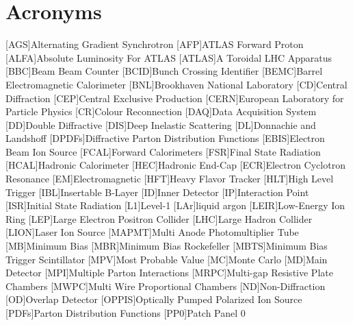 \chapter{Acronyms}\label{chapter:acronyms}

\begin{acronym}[BRAHMS]
	[AGS]{Alternating Gradient Synchrotron}
	[AFP]{ATLAS Forward Proton}
	[ALFA]{Absolute Luminosity For ATLAS}
	[ATLAS]{A Toroidal LHC Apparatus}
	[BBC]{Beam Beam Counter}
	[BCID]{Bunch Crossing Identifier}
	[BEMC]{Barrel Electromagnetic Calorimeter}
	[BNL]{Brookhaven National Laboratory}
	[CD]{Central Diffraction}
	[CEP]{Central Exclusive Production}
	[CERN]{European Laboratory for Particle Physics }
	[CR]{Colour Reconnection}
	[DAQ]{Data Acquisition System}
	[DD]{Double Diffractive}
	[DIS]{Deep Inelastic Scattering}
	[DL]{Donnachie and Landshoff}
	[DPDFs]{Diffractive Parton
	Distribution Functions}
	[EBIS]{Electron Beam Ion Source}
	[FCAL]{Forward Calorimeters}
	[FSR]{Final State Radiation}
	[HCAL]{Hadronic Calorimeter}
	[HEC]{Hadronic End-Cap}
	[ECR]{Electron Cyclotron Resonance}
	[EM]{Electromagnetic}
	[HFT]{Heavy Flavor Tracker}
	[HLT]{High Level Trigger}
	[IBL]{Insertable B-Layer}
	[ID]{Inner Detector}
	[IP]{Interaction Point}
	[ISR]{Initial State Radiation}
	[L1]{Level-1}
	[LAr]{liquid argon}
	[LEIR]{Low-Energy Ion Ring}
	[LEP]{Large Electron Positron Collider}
	[LHC]{Large Hadron Collider}
	[LION]{Laser Ion Source}
	[MAPMT]{Multi Anode Photomultiplier Tube}
	[MB]{Minimum Bias}
	[MBR]{Minimum Bias Rockefeller}
	[MBTS]{Minimum Bias Trigger Scintillator}
	[MPV]{Most Probable Value}
	[MC]{Monte Carlo}
	[MD]{Main Detector}
	[MPI]{Multiple Parton Interactions}
	[MRPC]{Multi-gap
		Resistive Plate Chambers}
	[MWPC]{Multi Wire Proportional Chambers}
	[ND]{Non-Diffraction}
	[OD]{Overlap Detector}
	[OPPIS]{Optically Pumped Polarized Ion Source}
	[PDFs]{Parton Distribution Functions}
	[PP0]{Patch Panel 0}

\end{acronym}
